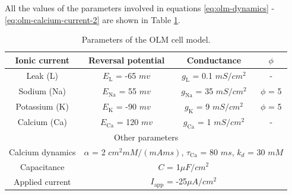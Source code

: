 \documentclass[../main.tex]{subfiles}
\begin{document}
All the values of the parameters involved in equations \eqref{eq:olm-dynamics} - \eqref{eq:olm-calcium-current-2} are shown in Table \ref{table:olm_parameters}.
\begin{table}[htb]
\def\arraystretch{1.4}
\caption{Parameters of the OLM cell model.}
\begin{center}
\begin{tabular}{|c|c|c|c|}
    \hline
    Ionic current & Reversal potential & Conductance & $\phi$ \\ \hline
    Leak (L)      & $E_{\text{L}}$ = -65 $mv$ & $g_{\text{L}}$  = 0.1 $mS/cm^2$ & -\\ \hline
    Sodium (Na)   & $E_{\text{Na}}$ = 55 $mv$ & $g_{\text{Na}}$ = 35 $mS/cm^2$  & $\phi$ = 5\\ \hline
    Potassium (K) & $E_{\text{K}}$ = -90 $mv$ & $g_{\text{K}}$  = 9 $mS/cm^2$   & $\phi$ = 5\\ \hline
    Calcium (Ca)  & $E_{\text{Ca}}$ = 120 $mv$ & $g_{\text{Ca}}$ = 1 $mS/cm^2$  & - \\ 
    \hline
    \multicolumn{4}{|c|}{Other parameters}\\ \hline
    Calcium dynamics &\multicolumn{3}{c|}{$\alpha$ = 2 $cm^2mM/(mA ms)$, $\tau_{\text{Ca}}$ = 80 $ms$, $k_d$ = 30 $mM$} \\
    \hline
    Capacitance      &  \multicolumn{3}{c|}{$C$ = 1$\mu F/cm^2$} \\ \hline
    Applied current  &  \multicolumn{3}{c|}{$I_{\text{app}}$ = -25$\mu A/cm^2$}\\
    \hline
\end{tabular}
\label{table:olm_parameters}
\end{center}
\end{table}

\end{document}
